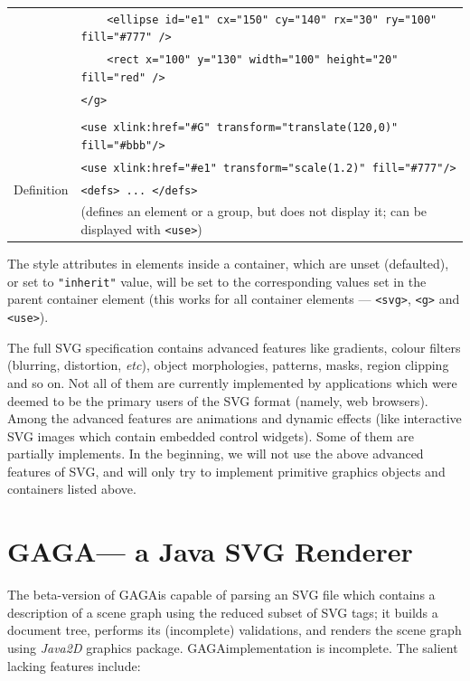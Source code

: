 \documentclass[a4paper]{article}
\newcommand{\forge}{\textsf{GAGA\space}}
\begin{document}
\begin{center}
\begin{tabular}{|l|l|}
        &\verb!    <ellipse id="e1" cx="150" cy="140" rx="30" ry="100" fill="#777" />! \\
        &\verb!    <rect x="100" y="130" width="100" height="20" fill="red" />! \\
        &\verb!</g>!\\
        & \\
        & \verb!<use xlink:href="#G" transform="translate(120,0)" fill="#bbb"/>!\\
        & \verb!<use xlink:href="#e1" transform="scale(1.2)" fill="#777"/>!\\
        \hline
        \textsf{Definition} & \verb!<defs> ... </defs>!\\
        & (defines an element or a group, but does not display it; can be displayed with \verb!<use>!) \\
        \hline
\end{tabular}
\end{center}

The style attributes in elements inside a container, which are unset (defaulted), or set to
\verb!"inherit"! value, will be set to the corresponding values set in the parent container 
element (this works for all container elements --- \verb!<svg>!, \verb!<g>! and \verb!<use>!).

The full SVG specification contains advanced features like gradients, colour filters
(blurring, distortion, \emph{etc}), object morphologies, patterns, masks, region clipping
and so on. Not all of them are currently implemented by applications which were deemed to be
the primary users of the SVG format (namely, web browsers). Among the advanced features are
animations and dynamic effects (like interactive SVG images which contain embedded
control widgets). Some of them are partially implements. In the beginning, we will not use the 
above advanced features of SVG, and will only try to implement primitive graphics objects 
and containers listed above.

\section*{\forge --- a Java SVG Renderer} %
\label{sec:forge_a_java_svg_renderer}

The beta-version of \forge is capable of parsing an SVG file which contains a description of a
scene graph using the reduced subset of SVG tags; it builds a document tree, performs
its (incomplete) validations, and renders the scene graph using \emph{Java2D} graphics
package. \forge implementation is incomplete. The salient lacking features include:
\end{document}
